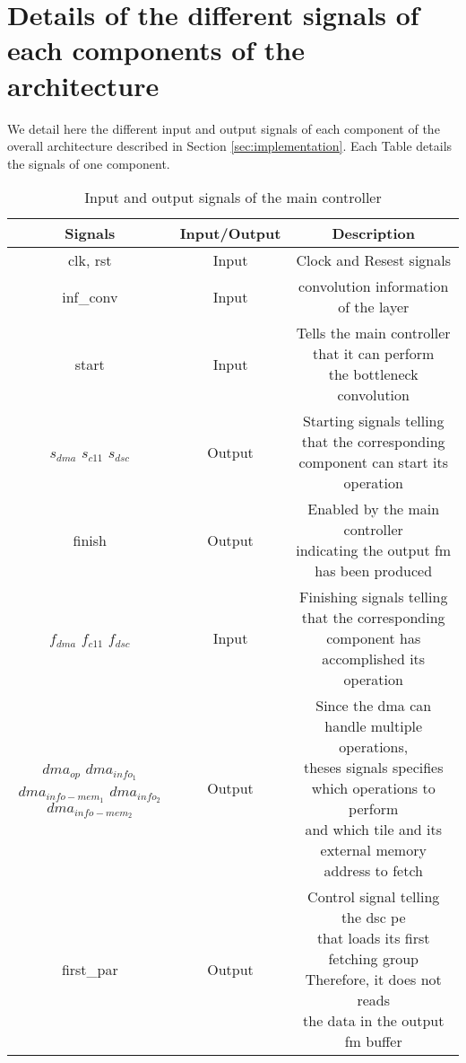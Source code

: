 \chapter{Details of the different signals of each components of the architecture} \label{appendix:sig}
We detail here the different input and output signals of each component of the overall architecture described in Section \ref{sec:implementation}. Each Table details the signals of one component.

\begin{table}[H]
    \begin{tabular}{c|c|c}
        Signals & Input/Output & Description \\
        \hline \hline
        clk, rst & Input & Clock and Resest signals \\
        \hline
        inf\_conv & Input & convolution information of the layer\\
        \hline
        start & Input & \makecell{Tells the main controller that it can perform \\ the bottleneck convolution} \\
        \hline
        \makecell{$s_{dma}$ \\$s_{c11}$\\$s_{dsc}$} & Output & \makecell{Starting signals telling that the corresponding \\ component can start its operation}\\
        \hline
        finish & Output & \makecell{Enabled by the main controller \\ indicating the output \acrshort{fm} has been produced}\\
        \hline
        \makecell{$f_{dma}$ \\$f_{c11}$\\$f_{dsc}$} & Input & \makecell{Finishing signals telling that the corresponding \\ component has accomplished its operation}\\
        \hline
        \makecell{$dma_{op}$\\$dma_{info_1}$\\$dma_{info-mem_1}$\\$dma_{info_2}$\\$dma_{info-mem_2}$} & Output & \makecell{Since the \acrshort{dma} can handle multiple operations,\\ theses signals specifies which operations to perform \\ and which tile and its external memory address to fetch}\\
        \hline
        first\_par & Output & \makecell{Control signal telling the \acrshort{dsc} \acrshort{pe} \\ that loads its first fetching group \\ Therefore, it does not reads \\ the data in the output \acrshort{fm} buffer} \\
        \hline \hline
    \end{tabular}
    \caption{Input and output signals of the main controller}
    \label{tab:mc_sig}
\end{table}
